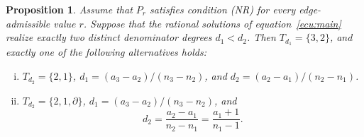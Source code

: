 \documentclass[12pt,a4paper]{amsart}
\numberwithin{theorem}{section}
\newtheorem{proposition}[theorem]{Proposition}
\theoremstyle{definition}
\begin{document}
	\begin{proposition}\label{prop:two-degree-configurations}
		Assume that $P_r$ satisfies condition {\rm (NR)} for every edge-admissible value $r$. Suppose that the rational solutions of equation~\eqref{ecu:main} realize exactly two distinct denominator degrees $d_1<d_2$. Then $T_{d_1}=\{3,2\}$, and exactly one of the following alternatives holds:
		\begin{enumerate}[(i)]
			\item $T_{d_2}=\{2,1\}$, $d_1=(a_3-a_2)/(n_3-n_2)$, and $d_2=(a_2-a_1)/(n_2-n_1)$.
			\item $T_{d_2}=\{2,1,\partial\}$, $d_1=(a_3-a_2)/(n_3-n_2)$, and
			\[
			d_2=\frac{a_2-a_1}{n_2-n_1}=\frac{a_1+1}{n_1-1}.
			\]
		\end{enumerate}
	\end{proposition}
	
\end{document}
